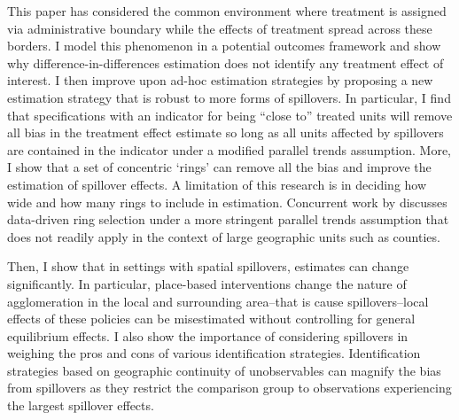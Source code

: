 \documentclass[11pt]{article}
\begin{document}
This paper has considered the common environment where treatment is assigned via administrative boundary while the effects of treatment spread across these borders. I model this phenomenon in a potential outcomes framework and show why difference-in-differences estimation does not identify any treatment effect of interest. I then improve upon ad-hoc estimation strategies by proposing a new estimation strategy that is robust to more forms of spillovers. In particular, I find that specifications with an indicator for being ``close to'' treated units will remove all bias in the treatment effect estimate so long as all units affected by spillovers are contained in the indicator under a modified parallel trends assumption. More, I show that a set of concentric `rings' can remove all the bias and improve the estimation of spillover effects. A limitation of this research is in deciding how wide and how many rings to include in estimation. Concurrent work by \citet{Butts_2021} discusses data-driven ring selection under a more stringent parallel trends assumption that does not readily apply in the context of large geographic units such as counties. 

Then, I show that in settings with spatial spillovers, estimates can change significantly. In particular, place-based interventions change the nature of agglomeration in the local and surrounding area--that is cause spillovers--local effects of these policies can be misestimated without controlling for general equilibrium effects. I also show the importance of considering spillovers in weighing the pros and cons of various identification strategies. Identification strategies based on geographic continuity of unobservables can magnify the bias from spillovers as they restrict the comparison group to observations experiencing the largest spillover effects.


\setlength{\bibsep}{0.0pt}



\appendix 
{}
\renewcommand{\thefigure}{\Alph{section}\arabic{figure}}
\renewcommand{\thetable}{\Alph{section}\arabic{table}}

\end{document}
